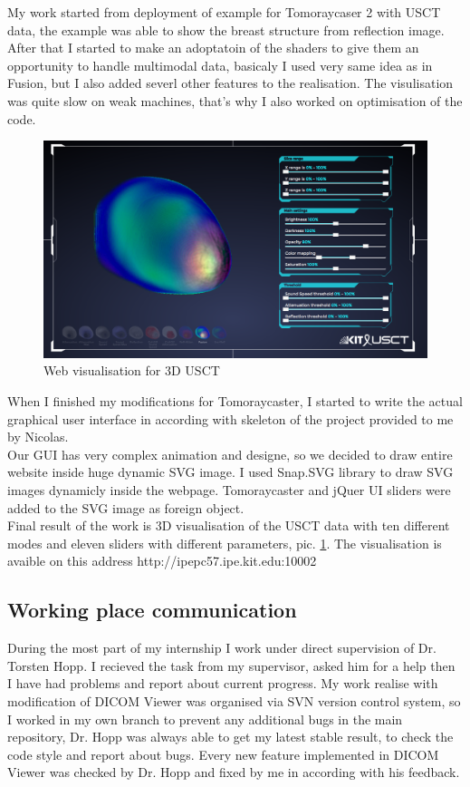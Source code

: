 \documentclass[english]{article}
\begin{document}
My work started from deployment of example for Tomoraycaser 2 with USCT data, the example was able to show the breast structure from reflection image. After that I started to make an adoptatoin of the shaders to give them an opportunity to handle multimodal data, basicaly I used very same idea as in Fusion, but I also added severl other features to the realisation. The visulisation was quite slow on weak machines, that's why I also worked on optimisation of the code.\\

\begin{figure}[H]
\centerline{\includegraphics[scale=0.4]{internship_report/usct}}
\caption{Web visualisation for 3D USCT\label{fig:usct}}
\end{figure}

When I finished my modifications for Tomoraycaster, I started to write the actual graphical user interface in according with skeleton of the project provided to me by Nicolas.\\

Our GUI has very complex animation and designe, so we decided to draw entire website inside huge dynamic SVG image. I used Snap.SVG library to draw SVG images dynamicly inside the webpage. Tomoraycaster and jQuer UI sliders were added to the SVG image as foreign object.\\

Final result of the work is 3D visualisation of the USCT data with ten different modes and eleven sliders with different parameters, pic. \ref{fig:usct}. The visualisation is avaible on this address http://ipepc57.ipe.kit.edu:10002

\subsection{Working place communication}
During the most part of my internship I work under direct supervision of Dr. Torsten Hopp. I recieved the task from my supervisor, asked him for a help then I have had problems and report about current progress. My work realise with modification of DICOM Viewer was organised via SVN version control system, so I worked in my own branch to prevent any additional bugs in the main repository, Dr. Hopp was always able to get my latest stable result, to check the code style and report about bugs. Every new feature implemented in DICOM Viewer was checked by Dr. Hopp and fixed by me in according with his feedback.\\
\end{document}
